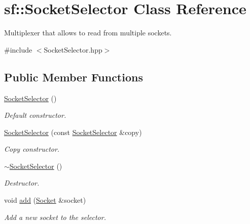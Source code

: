 \hypertarget{classsf_1_1_socket_selector}{}\section{sf\+:\+:Socket\+Selector Class Reference}
\label{classsf_1_1_socket_selector}


Multiplexer that allows to read from multiple sockets.  




{\ttfamily \#include $<$Socket\+Selector.\+hpp$>$}

\subsection*{Public Member Functions}
\begin{DoxyCompactItemize}
\item 
\mbox{\label{classsf_1_1_socket_selector_a741959c5158aeb1e4457cad47d90f76b}} 
\hyperlink{classsf_1_1_socket_selector_a741959c5158aeb1e4457cad47d90f76b}{Socket\+Selector} ()
\begin{DoxyCompactList}\small\item\em Default constructor. \end{DoxyCompactList}\item 
\hyperlink{classsf_1_1_socket_selector_a50b1b955eb7ecb2e7c2764f3f4722fbf}{Socket\+Selector} (const \hyperlink{classsf_1_1_socket_selector}{Socket\+Selector} \&copy)
\begin{DoxyCompactList}\small\item\em Copy constructor. \end{DoxyCompactList}\item 
\mbox{\label{classsf_1_1_socket_selector_a9069cd61208260b8ed9cf233afa1f73d}} 
\hyperlink{classsf_1_1_socket_selector_a9069cd61208260b8ed9cf233afa1f73d}{$\sim$\+Socket\+Selector} ()
\begin{DoxyCompactList}\small\item\em Destructor. \end{DoxyCompactList}\item 
void \hyperlink{classsf_1_1_socket_selector_ade952013232802ff7b9b33668f8d2096}{add} (\hyperlink{classsf_1_1_socket}{Socket} \&socket)
\begin{DoxyCompactList}\small\item\em Add a new socket to the selector. \end{DoxyCompactList}\item 

\end{DoxyCompactItemize}
